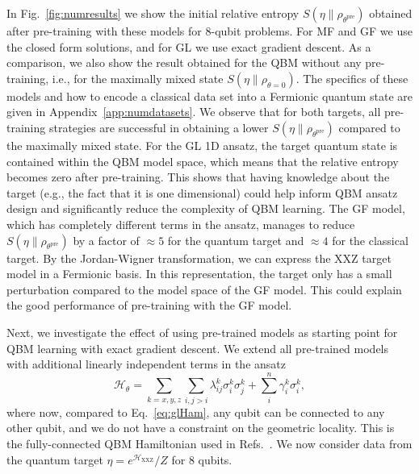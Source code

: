 \documentclass[
    aps,
    prx,
    onecolumn
]{revtex4-2}
\begin{document}
In Fig.~\ref{fig:numresults} we show the initial relative entropy $S(\eta\|\rho_{\theta^{\mathrm{pre}}})$ obtained after pre-training with these models for 8-qubit problems. For MF and GF we use the closed form solutions, and for GL we use exact gradient descent. As a comparison, we also show the result obtained for the QBM without any pre-training, i.e., for the maximally mixed state $S(\eta\|\rho_{\theta=0})$. The specifics of these models and how to encode a classical data set into a Fermionic quantum state are given in Appendix~\ref{app:numdatasets}. We observe that for both targets, all pre-training strategies are successful in obtaining a lower $S(\eta\|\rho_{\theta^{\mathrm{pre}}})$ compared to the maximally mixed state. For the GL 1D ansatz, the target quantum state is contained within the QBM model space, which means that the relative entropy becomes zero after pre-training. This shows that having knowledge about the target (e.g., the fact that it is one dimensional) could help inform QBM ansatz design and significantly reduce the complexity of QBM learning. The GF model, which has completely different terms in the ansatz, manages to reduce $S(\eta\|\rho_{\theta^{\mathrm{pre}}})$ by a factor of $\approx 5$ for the quantum target and $\approx 4$ for the classical target. By the Jordan-Wigner transformation, we can express the XXZ target model in a Fermionic basis. In this representation, the target only has a small perturbation compared to the model space of the GF model. This could explain the good performance of pre-training with the GF model. 

Next, we investigate the effect of using pre-trained models as starting point for QBM learning with exact gradient descent. We extend all pre-trained models with additional linearly independent terms in the ansatz
\begin{equation} 
\label{eq:fully_connect_qbm}
    \mathcal{H}_\theta = \sum_{k=x,y,z}\sum_{i, j>i}\lambda^k_{ij}\sigma_i^k\sigma^k_j + \sum_i^n \gamma^k_i\sigma^k_i,
\end{equation} 
where now, compared to Eq.~\eqref{eq:glHam}, any qubit can be connected to any other qubit, and we do not have a constraint on the geometric locality. This is the fully-connected QBM Hamiltonian used in Refs.~\cite{Kappen_2020, Coopmans_2023}. We now consider data from the quantum target $\eta = e^{{\mathcal{H}_\mathrm{XXZ}}}/Z$ for $8$ qubits.
\end{document}
